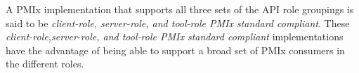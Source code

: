 A \ac{PMIx} implementation that supports all three sets of the \ac{API} role groupings is said to be \emph{client-role, server-role, and tool-role \ac{PMIx} standard compliant}.
These \emph{client-role,server-role, and tool-role \ac{PMIx} standard compliant} implementations have the advantage of being able to support a broad set of \ac{PMIx} consumers in the different roles.
\adviceimplend

